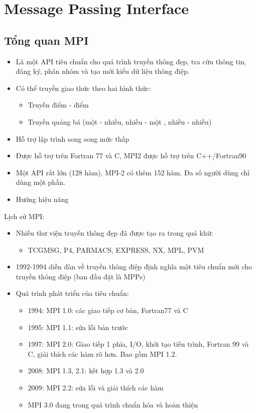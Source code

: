 \documentclass[14pt, a4paper]{article}
\numberwithin{equation}{section}
\numberwithin{figure}{section}
\numberwithin{dl}{section}
\numberwithin{md}{section}
\numberwithin{bd}{section}
\numberwithin{dn}{section}
\numberwithin{hq}{section}
\begin{document}
\section{Message Passing Interface}

\subsection{Tổng quan MPI}

\begin{itemize}
    \item Là một API tiêu chuẩn cho quá trình truyền thông đẹp, tra cứu thông tin, đăng ký, phân nhóm và tạo mới kiểu dữ liệu thông điệp.
    \item Có thể truyền giao thức theo hai hình thức:
    \begin{itemize}
        \item Truyền điểm - điểm
        \item Truyền quảng bá (một - nhiều, nhiều - một , nhiều - nhiều)
    \end{itemize}
    \item Hỗ trợ lập trình song song mức thấp
    \item Được hỗ trợ trên Fortran 77 và C, MPI2 được hỗ trợ trên C++/Fortran90
    \item Một API rất lớn (128 hàm), MPI-2 có thêm 152 hàm. Đa số người dùng chỉ dùng một phần.
    \item Hướng hiệu năng
\end{itemize}

Lịch sử MPI:

\begin{itemize}
    \item Nhiều thư viện truyền thông đẹp đã được tạo ra trong quá khứ:
    \begin{itemize}
        \item TCGMSG, P4, PARMACS, EXPRESS, NX, MPL, PVM
    \end{itemize}
    \item 1992-1994 diễn đàn về truyền thông điệp định nghĩa một tiêu chuẩn mới cho truyền thông điệp (ban đầu đặt là MPPs)
    \item Quá trình phát triển của tiêu chuẩn:
    \begin{itemize}
        \item 1994: MPI 1.0: các giao tiếp cơ bản, Fortran77 và C
        \item 1995: MPI 1.1: sửa lỗi bản trước
        \item 1997: MPI 2.0: Giao tiếp 1 phía, I/O, khởi tạo tiến trình, Fortran 99 và C, giải thích các hàm rõ hơn. Bao gồm MPI 1.2.
        \item 2008: MPI 1.3, 2.1: kết hợp 1.3 và 2.0
        \item 2009: MPI 2.2: sửa lỗi và giải thích các hàm
        \item MPI 3.0 đang trong quá trình chuẩn hóa và hoàn thiện
    \end{itemize}
\end{itemize}
\end{document}

